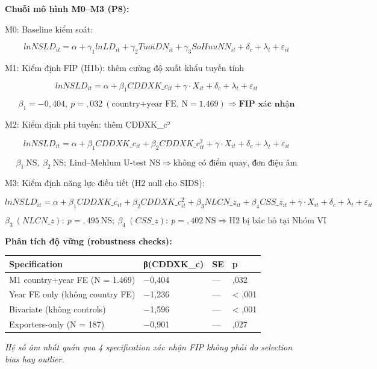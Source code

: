 \documentclass[12pt,a4paper]{article}
\begin{document}
\textbf{Chuỗi mô hình M0--M3 (P8):}

M0: Baseline kiểm soát:

\[lnNSLD_{it} = \alpha + \gamma_1 lnLD_{it} + \gamma_2 TuoiDN_{it} + \gamma_3 SoHuuNN_{it} + \delta_c + \lambda_t + \varepsilon_{it}\]

M1: Kiểm định FIP (H1b): thêm cường độ xuất khẩu tuyến tính

\[lnNSLD_{it} = \alpha + \beta_1 CDDXK\_c_{it} + \gamma \cdot X_{it} + \delta_c + \lambda_t + \varepsilon_{it}\]

\[\beta_1 = -0{,}404,\ p = {,}032\ (\text{country+year FE, N} = 1{.}469) \Rightarrow \textbf{FIP xác nhận}\]

M2: Kiểm định phi tuyến: thêm CDDXK\_c²

\[lnNSLD_{it} = \alpha + \beta_1 CDDXK\_c_{it} + \beta_2 CDDXK\_c^2_{it} + \gamma \cdot X_{it} + \delta_c + \lambda_t + \varepsilon_{it}\]

\[\beta_1\ \text{NS},\ \beta_2\ \text{NS};\ \text{Lind–Mehlum U-test NS} \Rightarrow \text{không có điểm quay, đơn điệu âm}\]

M3: Kiểm định năng lực điều tiết (H2 null cho SIDS):

\[lnNSLD_{it} = \alpha + \beta_1 CDDXK\_c_{it} + \beta_2 CDDXK\_c^2_{it} + \beta_3 NLCN\_z_{it} + \beta_4 CSS\_z_{it} + \gamma \cdot X_{it} + \delta_c + \lambda_t + \varepsilon_{it}\]

\[\beta_3\ (NLCN\_z):\ p = {,}495\ \text{NS};\ \beta_4\ (CSS\_z):\ p = {,}402\ \text{NS} \Rightarrow \text{H2 bị bác bỏ tại Nhóm VI}\]

\textbf{Phân tích độ vững (robustness checks):}

\begin{longtable}[]{@{}llll@{}}
\toprule\noalign{}
Specification & β(CDDXK\_c) & SE & p \\
\midrule\noalign{}
\endhead
\bottomrule\noalign{}
\endlastfoot
M1 country+year FE (N = 1.469) & −0,404 & --- & ,032 \\
Year FE only (không country FE) & −1,236 & --- & \textless{} ,001 \\
Bivariate (không controls) & −1,596 & --- & \textless{} ,001 \\
Exporters-only (N = 187) & −0,901 & --- & ,027 \\
\end{longtable}

\emph{Hệ số âm nhất quán qua 4 specification xác nhận FIP không phải do
selection bias hay outlier.}
\end{document}
